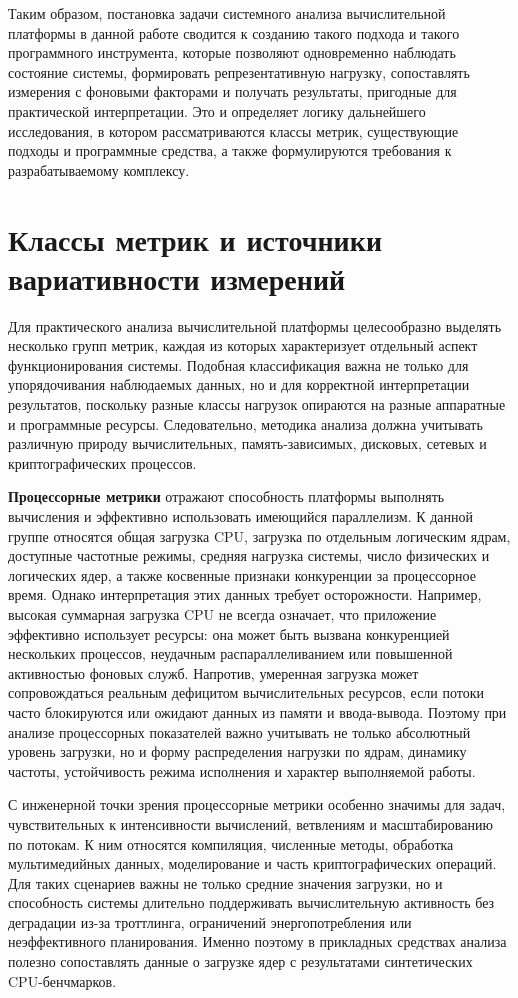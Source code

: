 Таким образом, постановка задачи системного анализа вычислительной платформы в данной работе сводится к созданию такого подхода и такого программного инструмента, которые позволяют одновременно наблюдать состояние системы, формировать репрезентативную нагрузку, сопоставлять измерения с фоновыми факторами и получать результаты, пригодные для практической интерпретации. Это и определяет логику дальнейшего исследования, в котором рассматриваются классы метрик, существующие подходы и программные средства, а также формулируются требования к разрабатываемому комплексу.

\section{Классы метрик и источники вариативности измерений}

Для практического анализа вычислительной платформы целесообразно выделять несколько групп метрик, каждая из которых характеризует отдельный аспект функционирования системы. Подобная классификация важна не только для упорядочивания наблюдаемых данных, но и для корректной интерпретации результатов, поскольку разные классы нагрузок опираются на разные аппаратные и программные ресурсы. Следовательно, методика анализа должна учитывать различную природу вычислительных, память-зависимых, дисковых, сетевых и криптографических процессов.

\textbf{Процессорные метрики} отражают способность платформы выполнять вычисления и эффективно использовать имеющийся параллелизм. К данной группе относятся общая загрузка CPU, загрузка по отдельным логическим ядрам, доступные частотные режимы, средняя нагрузка системы, число физических и логических ядер, а также косвенные признаки конкуренции за процессорное время. Однако интерпретация этих данных требует осторожности. Например, высокая суммарная загрузка CPU не всегда означает, что приложение эффективно использует ресурсы: она может быть вызвана конкуренцией нескольких процессов, неудачным распараллеливанием или повышенной активностью фоновых служб. Напротив, умеренная загрузка может сопровождаться реальным дефицитом вычислительных ресурсов, если потоки часто блокируются или ожидают данных из памяти и ввода-вывода. Поэтому при анализе процессорных показателей важно учитывать не только абсолютный уровень загрузки, но и форму распределения нагрузки по ядрам, динамику частоты, устойчивость режима исполнения и характер выполняемой работы.

С инженерной точки зрения процессорные метрики особенно значимы для задач, чувствительных к интенсивности вычислений, ветвлениям и масштабированию по потокам. К ним относятся компиляция, численные методы, обработка мультимедийных данных, моделирование и часть криптографических операций. Для таких сценариев важны не только средние значения загрузки, но и способность системы длительно поддерживать вычислительную активность без деградации из-за троттлинга, ограничений энергопотребления или неэффективного планирования. Именно поэтому в прикладных средствах анализа полезно сопоставлять данные о загрузке ядер с результатами синтетических CPU-бенчмарков.

